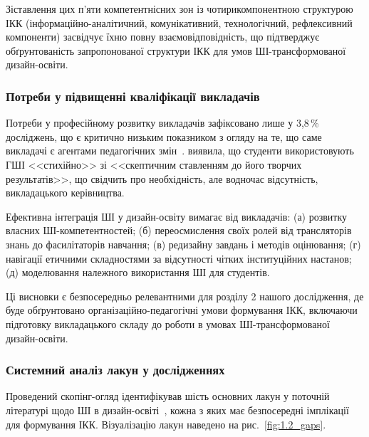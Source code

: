 Зіставлення цих п'яти компетентнісних зон із чотирикомпонентною структурою ІКК (інформаційно-аналітичний, комунікативний, технологічний, рефлексивний компоненти) засвідчує їхню повну взаємовідповідність, що підтверджує обґрунтованість запропонованої структури ІКК для умов ШІ-трансформованої дизайн-освіти.

\subsubsection{Потреби у підвищенні кваліфікації викладачів}\label{sssec:1.2.13}

Потреби у професійному розвитку викладачів зафіксовано лише у 3,8\,\% досліджень, що є критично низьким показником з огляду на те, що саме викладачі є агентами педагогічних змін~\cite{Musiienko2026ScopingReview}. \citet{Fleischmann2024} виявила, що студенти використовують ГШІ <<стихійно>> зі <<скептичним ставленням до його творчих результатів>>, що свідчить про необхідність, але водночас відсутність, викладацького керівництва.

Ефективна інтеграція ШІ у дизайн-освіту вимагає від викладачів: (а) розвитку власних ШІ-компетентностей; (б) переосмислення своїх ролей від трансляторів знань до фасилітаторів навчання; (в) редизайну завдань і методів оцінювання; (г) навігації етичними складностями за відсутності чітких інституційних настанов; (д) моделювання належного використання ШІ для студентів.

Ці висновки є безпосередньо релевантними для розділу 2 нашого дослідження, де буде обґрунтовано організаційно-педагогічні умови формування ІКК, включаючи підготовку викладацького складу до роботи в умовах ШІ-трансформованої дизайн-освіти.

\subsubsection{Системний аналіз лакун у дослідженнях}\label{sssec:1.2.14}

Проведений скопінг-огляд ідентифікував шість основних лакун у поточній літературі щодо ШІ в дизайн-освіті~\cite{Musiienko2026ScopingReview}, кожна з яких має безпосередні імплікації для формування ІКК. Візуалізацію лакун наведено на рис.~\ref{fig:1.2_gaps}.

